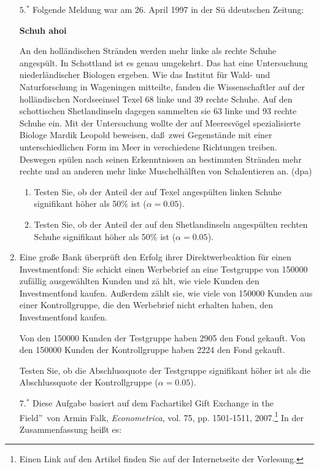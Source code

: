 \documentclass{article}
\begin{document}
\begin{enumerate}
\item[$5.^{\ast }$] Folgende Meldung war am 26. April 1997 in der S\"{u}%
ddeutschen Zeitung:

\textbf{Schuh ahoi}

An den holl\"{a}ndischen Str\"{a}nden werden mehr linke als rechte Schuhe
angesp\"{u}lt. In Schottland ist es genau umgekehrt. Das hat eine
Untersuchung niederl\"{a}ndischer Biologen ergeben. Wie das Institut f\"{u}r
Wald- und Naturforschung in Wageningen mitteilte, fanden die Wissenschaftler
auf der holl\"{a}ndischen Nordseeinsel Texel 68 linke und 39 rechte Schuhe.
Auf den schottischen Shetlandinseln dagegen sammelten sie 63 linke und 93
rechte Schuhe ein. Mit der Untersuchung wollte der auf Meeresv\"{o}gel
spezialisierte Biologe Mardik Leopold beweisen, da\ss\ zwei Gegenst\"{a}nde
mit einer unterschiedlichen Form im Meer in verschiedene Richtungen treiben.
Deswegen sp\"{u}len nach seinen Erkenntnissen an bestimmten Str\"{a}nden
mehr rechte und an anderen mehr linke Muschelh\"{a}lften von Schalentieren
an. (dpa)

\begin{enumerate}
\item Testen Sie, ob der Anteil der auf Texel angesp\"{u}lten linken Schuhe
signifikant h\"{o}her als 50\% ist ($\alpha =0.05$).

\item Testen Sie, ob der Anteil der auf den Shetlandinseln angesp\"{u}lten
rechten Schuhe signifikant h\"{o}her als 50\% ist ($\alpha =0.05$).
\end{enumerate}

\item Eine gro\ss e Bank \"{u}berpr\"{u}ft den Erfolg ihrer
Direktwerbeaktion f\"{u}r einen Investmentfond: Sie schickt einen Werbebrief
an eine Testgruppe von 150000 zuf\"{a}llig ausgew\"{a}hlten Kunden und z\"{a}%
hlt, wie viele Kunden den Investmentfond kaufen. Au\ss erdem z\"{a}hlt sie,
wie viele von 150000 Kunden aus einer Kontrollgruppe, die den Werbebrief
nicht erhalten haben, den Investmentfond kaufen.

Von den 150000 Kunden der Testgruppe haben 2905 den Fond gekauft. Von den
150000 Kunden der Kontrollgruppe haben 2224 den Fond gekauft.

Testen Sie, ob die Abschlussquote der Testgruppe signifikant h\"{o}her ist
als die Abschlussquote der Kontrollgruppe ($\alpha =0.05$).

\item[$7.^{\ast }$] Diese Aufgabe basiert auf dem Fachartikel \quotedblbase
Gift Exchange in the Field\textquotedblright\ von Armin Falk, \emph{%
Econometrica}, vol. 75, pp. 1501-1511, 2007.\footnote{%
Einen Link auf den Artikel finden Sie auf der Internetseite der Vorlesung.}
In der Zusammenfassung hei\ss t es:


\end{enumerate}
\end{document}
